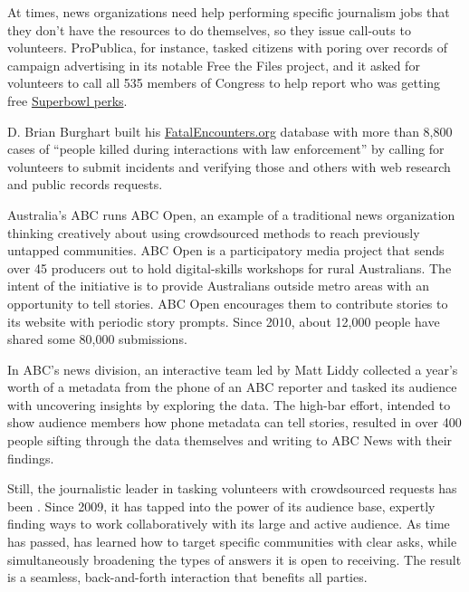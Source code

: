 \begin{itemize}
\begin{itemize}
\begin{enumerate}
{At times, news organizations need help performing specific journalism jobs that they don’t have the resources to do themselves, so they issue call-outs to volunteers. ProPublica, for instance, tasked citizens with poring over records of campaign advertising in its notable Free the Files project, and it asked for volunteers to call all 535 members of Congress to help report who was getting free \href{http://www.propublica.org/getinvolved/item/propublicas-super-bowl-blitz-which-congressmen-are-getting-super-bowl-perks}{Superbowl perks}.\autocite{perks}

D. Brian Burghart built his \href{http://www.fatalencounters.org}{FatalEncounters.org} database with more than 8,800 cases of ``people killed during interactions with law enforcement'' by calling for volunteers to submit incidents and verifying those and others with web research and public records requests.\autocite{Burghart}

Australia’s ABC runs ABC Open,\autocite{ABCOpen} an example of a traditional news organization thinking creatively about using crowdsourced methods to reach previously untapped communities. ABC Open is a participatory media project that sends over 45 producers out to hold digital-skills workshops for rural Australians. The intent of the initiative is to provide Australians outside metro areas with an opportunity to tell stories. ABC Open encourages them to contribute stories to its website with periodic story prompts. Since 2010, about 12,000 people have shared some 80,000 submissions. 

In ABC’s news division, an interactive team led by Matt Liddy collected a year’s worth of a metadata from the phone of an ABC reporter and tasked its audience with uncovering insights by exploring the data.\autocite{Liddy} The high-bar effort, intended to show audience members how phone metadata can tell stories, resulted in over 400 people sifting through the data themselves and writing to ABC News with their findings.\autocite{ABCNews}

Still, the journalistic leader in tasking volunteers with crowdsourced requests has been . Since 2009, it has tapped into the power of its audience base, expertly finding ways to work collaboratively with its large and active audience. As time has passed,  has learned how to target specific communities with clear asks, while simultaneously broadening the types of answers it is open to receiving. The result is a seamless, back-and-forth interaction that benefits all parties. 

}
\end{enumerate}
\end{itemize}
\end{itemize}
